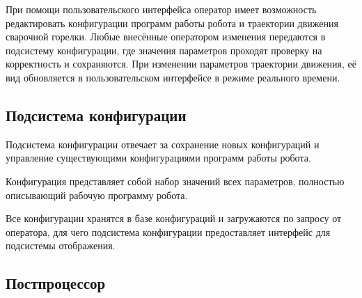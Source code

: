 При помощи пользовательского интерфейса оператор имеет возможность редактировать конфигурации программ работы робота и траектории движения сварочной горелки.
Любые внесённые оператором изменения передаются в подсистему конфигурации, где значения параметров проходят проверку на корректность и сохраняются.
При изменении параметров траектории движения, её вид обновляется в пользовательском интерфейсе в режиме реального времени.

\subsection{Подсистема конфигурации}
Подсистема конфигурации отвечает за сохранение новых конфигураций и управление существующими конфигурациями программ работы робота.

Конфигурация представляет собой набор значений всех параметров, полностью описывающий рабочую программу робота.

Все конфигурации хранятся в базе конфигураций и загружаются по запросу от оператора, для чего подсистема конфигурации предоставляет интерфейс для подсистемы отображения.

\subsection{Постпроцессор}

